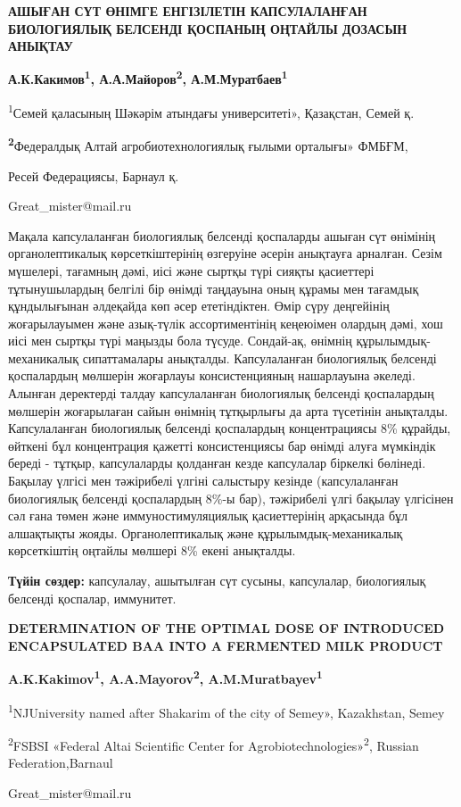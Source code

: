 \begin{center}
{\large\bfseries АШЫҒАН СҮТ ӨНІМГЕ ЕНГІЗІЛЕТІН КАПСУЛАЛАНҒАН БИОЛОГИЯЛЫҚ БЕЛСЕНДІ
ҚОСПАНЫҢ ОҢТАЙЛЫ ДОЗАСЫН АНЫҚТАУ}

\vspace{1em}
{\bfseries А.К.Какимов\textsuperscript{1}, А.А.Майоров\textsuperscript{2},
А.М.Муратбаев\textsuperscript{1 }}

\textsuperscript{1}Семей қаласының Шәкәрім атындағы университеті», Қазақстан, Семей қ.

{\bfseries \textsuperscript{2}}Федералдық Алтай агробиотехнологиялық ғылыми
орталығы» ФМБҒМ,

Ресей Федерациясы, Барнаул қ.

Great\_mister@mail.ru
\end{center}

\hspace{1.5em} Мақала капсулаланған биологиялық белсенді қоспаларды ашыған сүт өнімінің
органолептикалық көрсеткіштерінің өзгеруіне әсерін анықтауға арналған.
Сезім мүшелері, тағамның дәмі, иісі және сыртқы түрі сияқты қасиеттері
тұтынушылардың белгілі бір өнімді таңдауына оның құрамы мен тағамдық
құндылығынан әлдеқайда көп әсер ететіндіктен. Өмір сүру деңгейінің
жоғарылауымен және азық-түлік ассортиментінің кеңеюімен олардың дәмі,
хош иісі мен сыртқы түрі маңызды бола түсуде. Сондай-ақ, өнімнің
құрылымдық-механикалық сипаттамалары анықталды. Капсулаланған
биологиялық белсенді қоспалардың мөлшерін жоғарлауы консистенцияның
нашарлауына әкеледі. Алынған деректерді талдау капсулаланған биологиялық
белсенді қоспалардың мөлшерін жоғарылаған сайын өнімнің тұтқырлығы да
арта түсетінін анықталды. Капсулаланған биологиялық белсенді қоспалардың
концентрациясы 8\% құрайды, өйткені бұл концентрация қажетті
консистенциясы бар өнімді алуға мүмкіндік береді - тұтқыр, капсулаларды
қолданған кезде капсулалар біркелкі бөлінеді. Бақылау үлгісі мен
тәжірибелі үлгіні салыстыру кезінде (капсулаланған биологиялық белсенді
қоспалардың 8\%-ы бар), тәжірибелі үлгі бақылау үлгісінен сәл ғана төмен
және иммуностимуляциялық қасиеттерінің арқасында бұл алшақтықты жояды.
Органолептикалық және құрылымдық-механикалық көрсеткіштің оңтайлы
мөлшері 8\% екені анықталды.

\hspace{1.5em} {\bfseries Түйін сөздер:} капсулалау, ашытылған сүт сусыны, капсулалар,
биологиялық белсенді қоспалар, иммунитет.

\begin{center}
{\large\bfseries DETERMINATION OF THE OPTIMAL DOSE OF INTRODUCED ENCAPSULATED BAA
INTO A FERMENTED MILK PRODUCT}

\vspace{1em}
{\bfseries A.K.Kakimov\textsuperscript{1}, A.A.Mayorov\textsuperscript{2},
A.M.Muratbayev\textsuperscript{1}}

\textsuperscript{1}NJUniversity named after Shakarim of the city of
Semey», Kazakhstan, Semey

\textsuperscript{2}FSBSI «Federal Altai Scientific Center for
Agrobiotechnologies»\textsuperscript{2}, Russian Federation,Barnaul

Great\_mister@mail.ru
\end{center}

